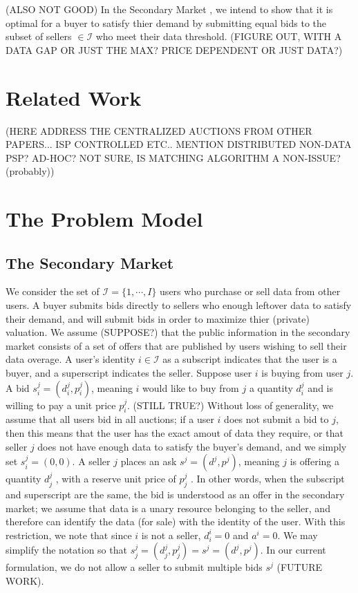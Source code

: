 \documentclass[12pt]{article}
\theoremstyle{definition}
\newcommand{\mcI}{\mathcal{I}}
\begin{document}
\begin{multicols}{2}
(ALSO NOT GOOD)
In the Secondary Market \cite{zheng}, we intend to show that it is optimal for a
buyer to satisfy thier demand by submitting equal bids to the subset of sellers
$\in \mcI$ who
meet their data threshold. (FIGURE OUT, WITH A
DATA GAP OR JUST THE MAX? PRICE DEPENDENT OR JUST DATA?)

\section{Related Work}
(HERE ADDRESS THE CENTRALIZED AUCTIONS FROM OTHER PAPERS... ISP CONTROLLED
ETC.. MENTION DISTRIBUTED NON-DATA PSP? AD-HOC? NOT SURE, IS MATCHING ALGORITHM
A NON-ISSUE? (probably)) 

\section{The Problem Model}
\subsection{The Secondary Market}

We consider the set of $\mcI = \lbrace 1, \cdots, I\rbrace$ users who purchase or sell
data from other users. A buyer submits bids directly to sellers who enough leftover data
to satisfy their demand, and will submit bids in order to maximize thier
(private) valuation. We assume (SUPPOSE?) that the public information in the
secondary market consists of a set of offers that are published by users
wishing to sell their data overage. 
A user's identity $i \in \mcI$ as a subscript indicates that the user
is a buyer, and a superscript indicates the seller.
Suppose user $i$ is buying from user $j$. A bid $s_i^j = (d_i^j, p_i^j)$,
meaning $i$ would like to buy from $j$ a quantity $d^j_i$ and is willing to pay
a unit price $p^j_i$. (STILL TRUE?) Without loss of generality, we assume that all users bid in all
auctions; if a user $i$ does not submit a bid to $j$, then this means that
the user has the exact amout of data they require, or that seller $j$ does not have
enough data to satisfy the buyer's demand, and we simply set $s^j_i = (0, 0)$.
A seller $j$ places an ask $s^j = (d^j, p^j)$, meaning $j$ is offering a
quantity $d_j^j$ , with a reserve unit price of $p_j^j$ . In other words, when the subscript and
superscript are the same, the bid is understood as an offer in the secondary
market; we assume that data is a unary resource belonging to the seller, and
therefore can identify the data (for sale) with the identity of the user.
With this restriction, we note that since $i$ is not a seller, $d_i^i = 0$ and
$a^i = 0$. We may simplify the notation so that $s_j^j = (d_j^j, p_j^j) = s^j =
(d^j, p^j)$. In our current formulation, we do not allow a seller to submit
multiple bids $s^j$ (FUTURE WORK).


\end{multicols}
\end{document}
